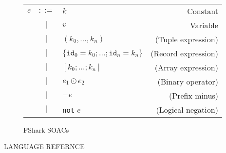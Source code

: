 \begin{figure}
  \centering
  \begin{tabular}{lclr}
    $e$ & $::=$ & $k$ & Constant \\
        & $|$   & $v$ & Variable \\
        & $|$   & $(k_0 , \ldots , k_n)$ & (Tuple expression) \\
        & $|$   & $\{\texttt{id}_0=k_0 ; \ldots ; \texttt{id}_n=k_n\}$ & (Record expression) \\
        & $|$   & $[k_0 ; \ldots ; k_n]$ & (Array expression) \\
        & $|$   & $e_1 \odot e_2$ & (Binary operator) \\
        & $|$   & $-e$ & (Prefix minus) \\
        & $|$   & \texttt{not} $e$ & (Logical negation) \\
  \end{tabular}
  \caption{FShark SOACs}
\end{figure}

LANGUAGE REFERNCE

